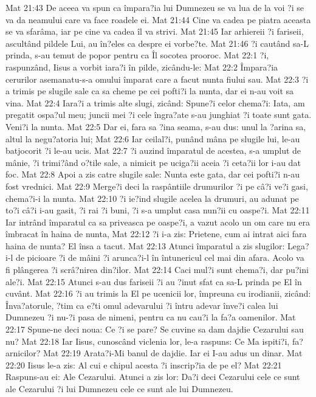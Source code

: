 Mat 21:43  De aceea va spun ca împara?ia lui Dumnezeu se va lua de la voi ?i se va da neamului care va face roadele ei.
Mat 21:44  Cine va cadea pe piatra aceasta se va sfarâma, iar pe cine va cadea îl va strivi.
Mat 21:45  Iar arhiereii ?i fariseii, ascultând pildele Lui, au în?eles ca despre ei vorbe?te.
Mat 21:46  ?i cautând sa-L prinda, s-au temut de popor pentru ca Îl socotea prooroc.
Mat 22:1  ?i, raspunzând, Iisus a vorbit iara?i în pilde, zicându-le:
Mat 22:2  Împara?ia cerurilor asemanatu-s-a omului împarat care a facut nunta fiului sau.
Mat 22:3  ?i a trimis pe slugile sale ca sa cheme pe cei pofti?i la nunta, dar ei n-au voit sa vina.
Mat 22:4  Iara?i a trimis alte slugi, zicând: Spune?i celor chema?i: Iata, am pregatit ospa?ul meu; juncii mei ?i cele îngra?ate s-au junghiat ?i toate sunt gata. Veni?i la nunta.
Mat 22:5  Dar ei, fara sa ?ina seama, s-au dus: unul la ?arina sa, altul la negu?atoria lui;
Mat 22:6  Iar ceilal?i, punând mâna pe slugile lui, le-au batjocorit ?i le-au ucis.
Mat 22:7  ?i auzind împaratul de acestea, s-a umplut de mânie, ?i trimi?ând o?tile sale, a nimicit pe uciga?ii aceia ?i ceta?ii lor i-au dat foc.
Mat 22:8  Apoi a zis catre slugile sale: Nunta este gata, dar cei pofti?i n-au fost vrednici.
Mat 22:9  Merge?i deci la raspântiile drumurilor ?i pe câ?i ve?i gasi, chema?i-i la nunta.
Mat 22:10  ?i ie?ind slugile acelea la drumuri, au adunat pe to?i câ?i i-au gasit, ?i rai ?i buni, ?i s-a umplut casa nun?ii cu oaspe?i.
Mat 22:11  Iar intrând împaratul ca sa priveasca pe oaspe?i, a vazut acolo un om care nu era îmbracat în haina de nunta,
Mat 22:12  ?i i-a zis: Prietene, cum ai intrat aici fara haina de nunta? El însa a tacut.
Mat 22:13  Atunci împaratul a zis slugilor: Lega?i-l de picioare ?i de mâini ?i arunca?i-l în întunericul cel mai din afara. Acolo va fi plângerea ?i scrâ?nirea din?ilor.
Mat 22:14  Caci mul?i sunt chema?i, dar pu?ini ale?i.
Mat 22:15  Atunci s-au dus fariseii ?i au ?inut sfat ca sa-L prinda pe El în cuvânt.
Mat 22:16  ?i au trimis la El pe ucenicii lor, împreuna cu irodianii, zicând: Înva?atorule, ?tim ca e?ti omul adevarului ?i întru adevar înve?i calea lui Dumnezeu ?i nu-?i pasa de nimeni, pentru ca nu cau?i la fa?a oamenilor.
Mat 22:17  Spune-ne deci noua: Ce ?i se pare? Se cuvine sa dam dajdie Cezarului sau nu?
Mat 22:18  Iar Iisus, cunoscând viclenia lor, le-a raspuns: Ce Ma ispiti?i, fa?arnicilor?
Mat 22:19  Arata?i-Mi banul de dajdie. Iar ei I-au adus un dinar.
Mat 22:20  Iisus le-a zis: Al cui e chipul acesta ?i inscrip?ia de pe el?
Mat 22:21  Raspuns-au ei: Ale Cezarului. Atunci a zis lor: Da?i deci Cezarului cele ce sunt ale Cezarului ?i lui Dumnezeu cele ce sunt ale lui Dumnezeu.
